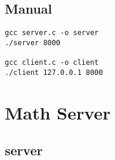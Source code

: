 \documentclass[12pt]{article}
\begin{document}
\subsection{Manual}

\begin{lstlisting}
gcc server.c -o server
./server 8000

gcc client.c -o client
./client 127.0.0.1 8000
\end{lstlisting}




\section{Math Server}
\subsection{server}
\end{document}

